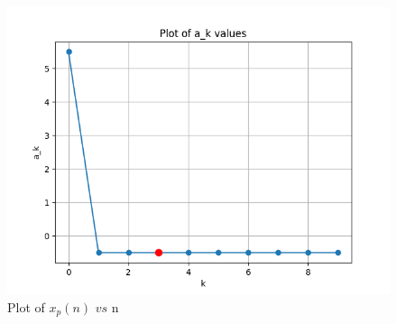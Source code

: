 \documentclass[journal,12pt,twocolumn]{IEEEtran}
\theoremstyle{remark}
\begin{document}
\begin{figure}[ht]
    \centering
    \includegraphics[width=\columnwidth]{figs/Figure_3.png}
    \caption{Plot of $x_p(n)$ $vs$ n}
    \label{fig:50.3}
\end{figure}
\end{document}
